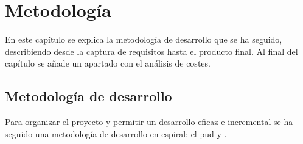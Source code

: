 \chapter{Metodología}
\label{cap:metodologia}

En este capítulo se explica la metodología de desarrollo que se ha seguido, describiendo desde la captura de requisitos hasta el producto final. Al final del capítulo se añade un apartado con el análisis de costes.

\section{Metodología de desarrollo}

Para organizar el proyecto y permitir un desarrollo eficaz e incremental se ha seguido una metodología de desarrollo en espiral: el \gls{pud}\cite{pud} y \cite{apuntes}.

